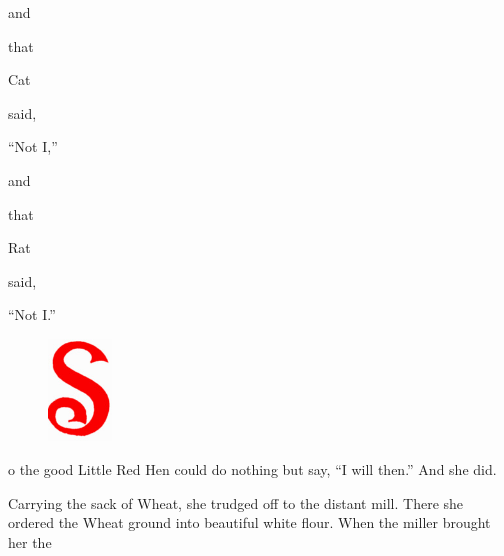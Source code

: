 \documentclass[letterpaper, 10pt, openany]{memoir}
\begin{document}
and

\vspace{\onelineskip}

that

\vspace{\onelineskip}

Cat

\vspace{\onelineskip}

said,

\vspace{\onelineskip}

``Not I,''

\vspace{\onelineskip}

and

\vspace{\onelineskip}

that

\vspace{\onelineskip}

Rat

\vspace{\onelineskip}

said,

\vspace{\onelineskip}

``Not I.''

\newpage
\begin{figure}
	\includegraphics[width=0.15\textwidth]{image_012_1.jpg}
\end{figure}
o the good Little Red Hen could do nothing but say, ``I will then.'' And she did.

\vspace{\onelineskip}

Carrying the sack of Wheat, she trudged off to the distant mill. There she ordered the Wheat
ground into beautiful white flour. When the miller brought her the

\vspace{\onelineskip}
\end{document}
